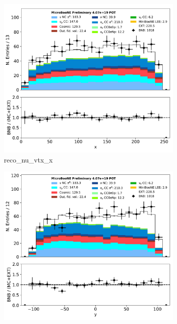 \documentclass[a4paper]{article}
\begin{document}
\begin{figure}[H] 
\begin{center}
    \begin{subfigure}[b]{0.3\textwidth}
    \centering
    \includegraphics[width=1.00\textwidth]{1eNp/dataMCRun1/reco_nu_vtx_x01152020.pdf}
    \caption{\label{fig:1eNp:dataMCRun1:reco_nu_vtx_x} reco\_nu\_vtx\_x }
    \end{subfigure}
    \begin{subfigure}[b]{0.3\textwidth}
    \centering
    \includegraphics[width=1.00\textwidth]{1eNp/dataMCRun1/reco_nu_vtx_y01152020.pdf}

\end{subfigure}
\end{center}
\end{figure}
\end{document}
